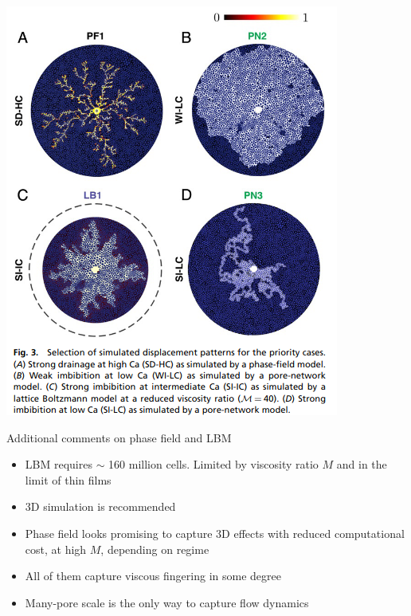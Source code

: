 \documentclass{beamer}
\begin{document}
	\begin{frame}
		\centering
		\includegraphics[scale=0.4]{pics/paperScenarios.png}
	\end{frame}
	
	\begin{frame}
		Additional comments on phase field and LBM
		\begin{itemize}
			\item LBM requires $\sim$ 160 million cells. Limited by viscosity ratio $M$ and in the limit of thin films
			\item 3D simulation is recommended
			\item Phase field looks promising to capture 3D effects with reduced computational cost, at high $M$, depending on regime
			\item All of them capture viscous fingering in some degree
			\item Many-pore scale is the only way to capture flow dynamics
		\end{itemize}
	\end{frame}
\end{document}
